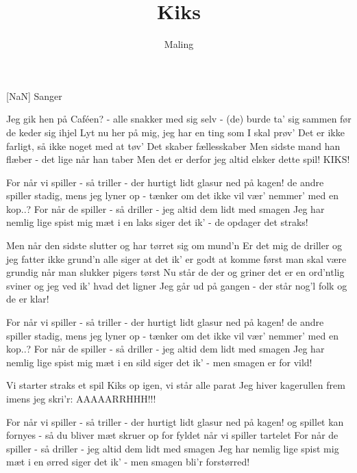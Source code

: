\documentclass[a4paper,11pt]{article}
\title{Kiks}
\author{Maling}
\begin{document}
\maketitle

\begin{roles}
[NaN] Sanger
\end{roles}

\begin{song}
 Jeg gik hen på Caféen? - alle snakker med sig selv -
(de) burde ta' sig sammen før de keder sig ihjel
Lyt nu her på mig, jeg har en ting som I skal prøv'
Det er ikke farligt, så ikke noget med at tøv'
Det skaber fællesskaber
Men sidste mand han flæber -
det lige når han taber
Men det er derfor jeg altid elsker dette spil! KIKS!

 For når vi spiller - så triller -
der hurtigt lidt glasur ned på kagen!
de andre spiller stadig, mens jeg lyner op -
tænker om det ikke vil vær' nemmer' med en kop..?
For når de spiller - så driller -
jeg altid dem lidt med smagen
Jeg har nemlig lige spist mig mæt i en laks
siger det ik' - de opdager det straks!

 Men når den sidste slutter og har tørret sig om mund'n
Er det mig de driller og jeg fatter ikke grund'n
alle siger at det ik' er godt at komme først
man skal være grundig når man slukker pigers tørst
Nu står de der og griner
det er en ord'ntlig sviner
og jeg ved ik' hvad det ligner
Jeg går ud på gangen - der står nog'l folk og de er klar!

 For når vi spiller - så triller -
der hurtigt lidt glasur ned på kagen!
de andre spiller stadig, mens jeg lyner op -
tænker om det ikke vil vær' nemmer' med en kop..?
For når de spiller - så driller -
jeg altid dem lidt med smagen
Jeg har nemlig lige spist mig mæt i en sild
siger det ik' - men smagen er for vild!

 Vi starter straks et spil Kiks op igen, vi står alle parat
Jeg hiver kagerullen frem imens jeg skri'r: AAAAARRHHH!!!


 For når vi spiller - så triller -
der hurtigt lidt glasur ned på kagen!
og spillet kan fornyes - så du bliver mæt
skruer op for fyldet når vi spiller tartelet
For når de spiller - så driller -
jeg altid dem lidt med smagen
Jeg har nemlig lige spist mig mæt i en ørred
siger det ik' - men smagen bli'r forstørred!
\end{song}
\end{document}

